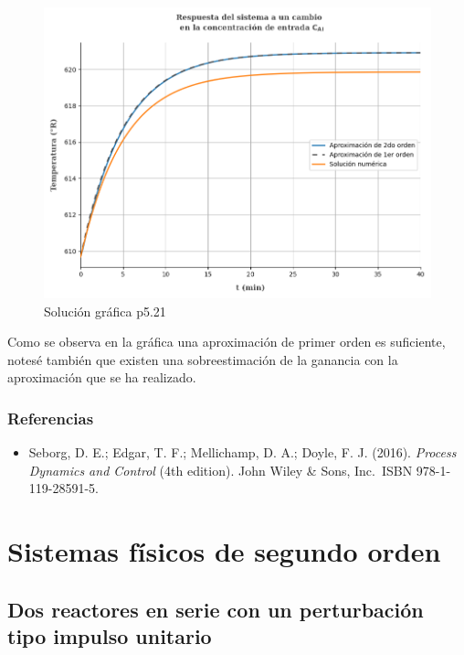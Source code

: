 \documentclass[
  letterpaper,
  DIV=11,
  numbers=noendperiod]{scrreprt}
\providecommand{\tightlist}{%
  \setlength{\itemsep}{0pt}\setlength{\parskip}{0pt}}\usepackage{longtable,booktabs,array}
\begin{document}
\begin{figure}

{\centering \includegraphics{././images/p5.21-seborg/p521r.png}

}

\caption{Solución gráfica p5.21}

\end{figure}

Como se observa en la gráfica una aproximación de primer orden es
suficiente, notesé también que existen una sobreestimación de la
ganancia con la aproximación que se ha realizado.

\hypertarget{referencias-10}{%
\section{Referencias}\label{referencias-10}}

\begin{itemize}
\tightlist
\item
  Seborg, D. E.; Edgar, T. F.; Mellichamp, D. A.; Doyle, F. J. (2016).
  \emph{Process Dynamics and Control} (4th edition). John Wiley \& Sons,
  Inc.~ISBN 978-1-119-28591-5.
\end{itemize}

\part{Sistemas físicos de segundo orden}

\hypertarget{dos-reactores-en-serie-con-un-perturbaciuxf3n-tipo-impulso-unitario}{%
\chapter{Dos reactores en serie con un perturbación tipo impulso
unitario}\label{dos-reactores-en-serie-con-un-perturbaciuxf3n-tipo-impulso-unitario}}
\end{document}

